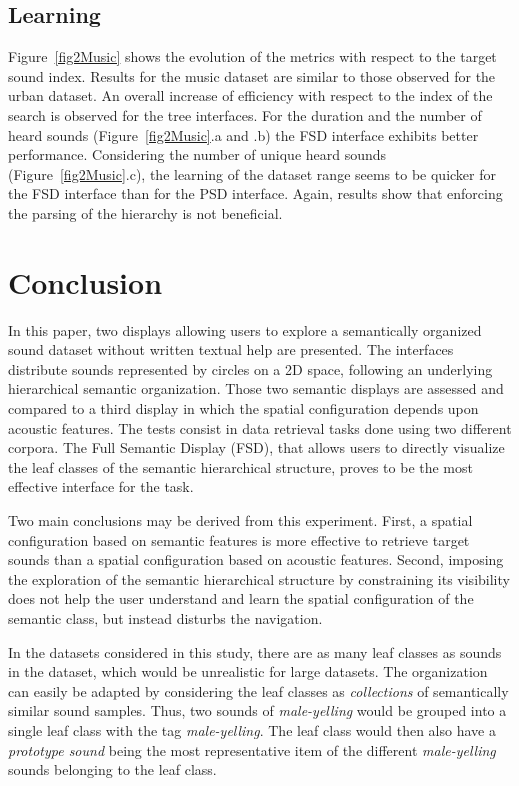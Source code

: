 \documentclass{aes2e}
\begin{document}
\subsection{Learning}

Figure~\ref{fig2Music} shows the evolution of the metrics with respect to the target sound index. Results for the music dataset are similar to those observed for the urban dataset. An overall increase of efficiency with respect to the index of the search is observed for the tree interfaces. For the duration and the number of heard sounds (Figure~\ref{fig2Music}.a and .b) the FSD interface exhibits better performance. Considering the number of unique heard sounds (Figure~\ref{fig2Music}.c), the learning of the dataset range seems to be quicker for the FSD interface than for the PSD interface. Again, results show that enforcing the parsing of the hierarchy is not beneficial.

\section{Conclusion}

In this paper, two displays allowing users to explore a semantically organized sound dataset without written textual help are presented. The interfaces distribute sounds represented by circles on a 2D space, following an underlying hierarchical semantic organization. Those two semantic displays are assessed and compared to a third display in which the spatial configuration depends upon acoustic features. The tests consist in data retrieval tasks done using two different corpora. 
The Full Semantic Display (FSD), that allows users to directly visualize the leaf classes of the semantic hierarchical structure, proves to be the most effective interface for the task.

Two main conclusions may be derived from this experiment. First, a spatial configuration based on semantic features is more effective to retrieve target sounds than a spatial configuration based on acoustic features. Second, imposing the exploration of the semantic hierarchical structure by constraining its visibility does not help the user understand and learn the spatial configuration of the semantic class, but instead disturbs the navigation. 

In the datasets considered in this study, there are as many leaf classes as sounds in the dataset, which would be unrealistic for large datasets. The organization can easily be adapted by considering the leaf classes as \textit{collections} of semantically similar sound samples. Thus, two sounds of \textit{male-yelling} would be grouped into a single leaf class with the tag \textit{male-yelling}. The leaf class would then also have a \textit{prototype sound} being the most representative item of the different \textit{male-yelling} sounds belonging to the leaf class.
\end{document}
